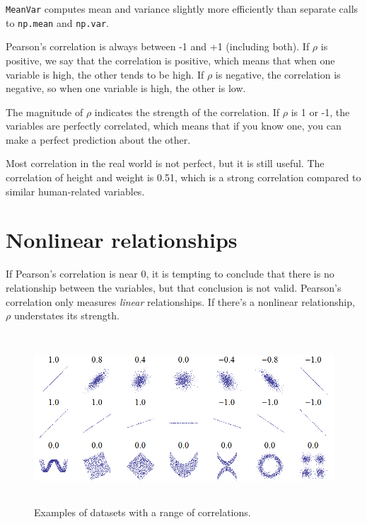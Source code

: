 {\tt MeanVar} computes mean and variance slightly more efficiently
than separate calls to {\tt np.mean} and {\tt np.var}.

Pearson's correlation is always between -1 and +1 (including both).
If $\rho$ is positive, we say that the correlation is positive,
which means that when one variable is high, the other tends to be
high.  If $\rho$ is negative, the correlation is negative, so
when one variable is high, the other is low.

The magnitude of $\rho$ indicates the strength of the correlation.  If
$\rho$ is 1 or -1, the variables are perfectly correlated, which means
that if you know one, you can make a perfect prediction about the
other.  

Most correlation in the real world is not perfect, but it is still
useful.  The correlation of height and weight is 0.51, which is a
strong correlation compared to similar human-related variables.


\section{Nonlinear relationships}

If Pearson's correlation is near 0, it is tempting to conclude
that there is no relationship between the variables, but that
conclusion is not valid.  Pearson's correlation only measures {\em
  linear} relationships.  If there's a nonlinear relationship, $\rho$
understates its strength.  

\begin{figure}
\centerline{\includegraphics[height=2.5in]{figs/Correlation_examples.png}}
\caption{Examples of datasets with a range of correlations.}
\label{corr_examples}
\end{figure}

